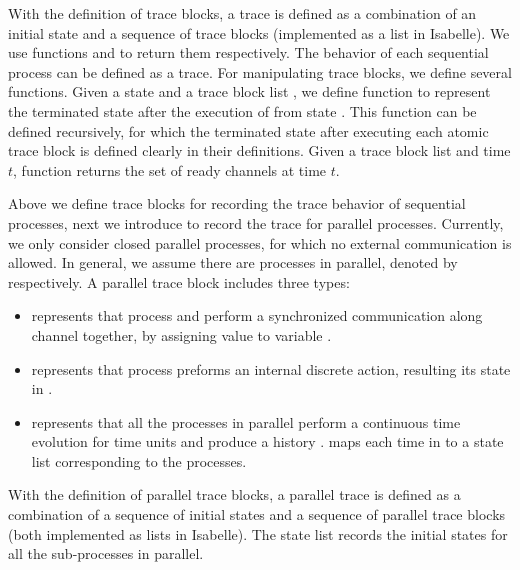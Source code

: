 \documentclass{llncs}
\begin{document}
 With the definition of trace blocks, a trace is defined as a combination of an initial state and a sequence of trace blocks (implemented as a list in Isabelle). We use functions  and  to return them respectively. The behavior of each sequential process can be defined as a trace.
 For manipulating trace blocks, we define several functions. Given a state  and a trace block list , we define function
  to represent the terminated state after the execution of  from state . This function can be defined recursively, for which the terminated state after executing each atomic trace block is defined clearly in their definitions.  Given a trace block list  and time $t$, function  returns the set of ready channels at time $t$. 
 
  Above we define trace blocks for recording the trace behavior of sequential processes, next we introduce  to record the trace for parallel processes. Currently, we only consider closed parallel processes, for which no external communication is allowed. In general, we assume there are  processes in parallel, denoted by  respectively.
 A parallel trace block  includes three types: 
 \begin{itemize}
   \item {} represents that process  and  perform a synchronized communication along channel  together, by assigning value  to variable .
       
       \item {} represents that process  preforms an internal discrete action, resulting its state in .
           
           \item {} represents that all the processes in parallel perform a continuous time evolution for  time units and produce a history .  maps each time in \isa{[0, d]} to a state list corresponding to the processes. 
               
  \end{itemize}
 With the definition of parallel trace blocks, a parallel trace is defined as a combination of a sequence of initial states and a sequence of parallel trace blocks (both implemented as lists in Isabelle). The state list records the initial states for all the sub-processes in parallel.
 
\end{document}
